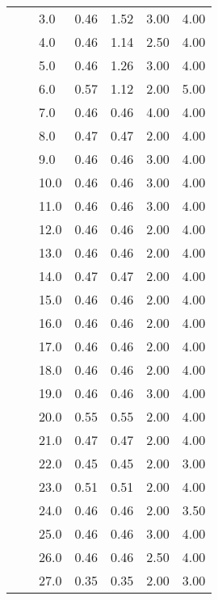 \begin{tabular}{lllrrrr}
       &     & 3.0  &       0.46 &      1.52 & 3.00 &   4.00 \\
       &     & 4.0  &       0.46 &      1.14 & 2.50 &   4.00 \\
       &     & 5.0  &       0.46 &      1.26 & 3.00 &   4.00 \\
       &     & 6.0  &       0.57 &      1.12 & 2.00 &   5.00 \\
       &     & 7.0  &       0.46 &      0.46 & 4.00 &   4.00 \\
       &     & 8.0  &       0.47 &      0.47 & 2.00 &   4.00 \\
       &     & 9.0  &       0.46 &      0.46 & 3.00 &   4.00 \\
       &     & 10.0 &       0.46 &      0.46 & 3.00 &   4.00 \\
       &     & 11.0 &       0.46 &      0.46 & 3.00 &   4.00 \\
       &     & 12.0 &       0.46 &      0.46 & 2.00 &   4.00 \\
       &     & 13.0 &       0.46 &      0.46 & 2.00 &   4.00 \\
       &     & 14.0 &       0.47 &      0.47 & 2.00 &   4.00 \\
       &     & 15.0 &       0.46 &      0.46 & 2.00 &   4.00 \\
       &     & 16.0 &       0.46 &      0.46 & 2.00 &   4.00 \\
       &     & 17.0 &       0.46 &      0.46 & 2.00 &   4.00 \\
       &     & 18.0 &       0.46 &      0.46 & 2.00 &   4.00 \\
       &     & 19.0 &       0.46 &      0.46 & 3.00 &   4.00 \\
       &     & 20.0 &       0.55 &      0.55 & 2.00 &   4.00 \\
       &     & 21.0 &       0.47 &      0.47 & 2.00 &   4.00 \\
       &     & 22.0 &       0.45 &      0.45 & 2.00 &   3.00 \\
       &     & 23.0 &       0.51 &      0.51 & 2.00 &   4.00 \\
       &     & 24.0 &       0.46 &      0.46 & 2.00 &   3.50 \\
       &     & 25.0 &       0.46 &      0.46 & 3.00 &   4.00 \\
       &     & 26.0 &       0.46 &      0.46 & 2.50 &   4.00 \\
       &     & 27.0 &       0.35 &      0.35 & 2.00 &   3.00 \\

\end{tabular}
